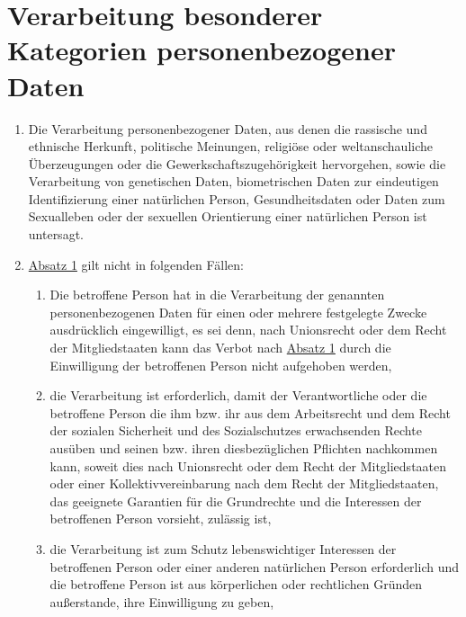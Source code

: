 \chapter{Verarbeitung besonderer Kategorien personenbezogener Daten}
\label{ch:09}


\begin{enumerate}

  \item Die Verarbeitung personenbezogener Daten, aus denen die rassische und ethnische Herkunft, politische Meinungen,
   religiöse oder weltanschauliche Überzeugungen oder die Gewerkschaftszugehörigkeit hervorgehen, sowie die
   Verarbeitung von genetischen Daten, biometrischen Daten zur eindeutigen Identifizierung einer natürlichen Person,
   Gesundheitsdaten oder Daten zum Sexualleben oder der sexuellen Orientierung einer natürlichen Person ist untersagt.
  \label{itm:09-1}

  \item \hyperref[itm:09-1]{Absatz 1} gilt nicht in folgenden Fällen:
  \label{itm:09-2}

  \begin{enumerate}
  
    \item Die betroffene Person hat in die Verarbeitung der genannten personenbezogenen Daten für einen oder mehrere
     festgelegte Zwecke ausdrücklich eingewilligt, es sei denn, nach Unionsrecht oder dem Recht der Mitgliedstaaten
     kann das Verbot nach \hyperref[itm:09-1]{Absatz 1} durch die Einwilligung der betroffenen Person nicht aufgehoben
     werden,
    \label{itm:09-2a}

    \item die Verarbeitung ist erforderlich, damit der Verantwortliche oder die betroffene Person die ihm bzw. ihr aus
     dem Arbeitsrecht und dem Recht der sozialen Sicherheit und des Sozialschutzes erwachsenden Rechte ausüben und
     seinen bzw. ihren diesbezüglichen Pflichten nachkommen kann, soweit dies nach Unionsrecht oder dem Recht der
     Mitgliedstaaten oder einer Kollektivvereinbarung nach dem Recht der Mitgliedstaaten, das geeignete Garantien für
     die Grundrechte und die Interessen der betroffenen Person vorsieht, zulässig ist,
    \label{itm:09-2b}

    \item die Verarbeitung ist zum Schutz lebenswichtiger Interessen der betroffenen Person oder einer anderen
     natürlichen Person erforderlich und die betroffene Person ist aus körperlichen oder rechtlichen Gründen
     außerstande, ihre Einwilligung zu geben,
    \label{itm:09-2c}


\end{enumerate}
\end{enumerate}
